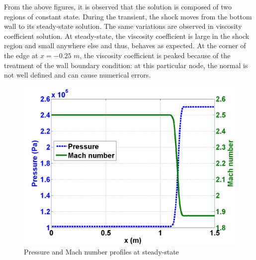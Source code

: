 From the above figures, it is observed that the solution is composed of two regions of constant state. During the transient, the shock moves from the bottom wall to its steady-state solution. The same variations are observed in viscosity coefficient solution. At steady-state, the viscosity coefficient is large in the shock region and small anywhere else and thus, behaves as expected. At the corner of the edge at $x=-0.25$ $m$, the viscosity coefficient is peaked because of the treatment of the wall boundary condition: at this particular node, the normal is not well defined and can cause numerical errors. 
        \begin{figure}[H]%
                \centering
                \includegraphics[scale=.50]{figures/mach_number_pressure.png}
                \caption{Pressure and Mach number profiles at steady-state}
                \label{fig:2d_corner_isomach}
        \end{figure}        
